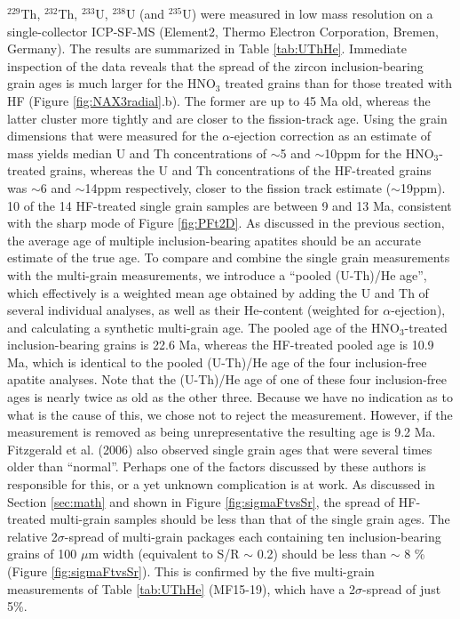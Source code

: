 \documentclass{article}
\begin{document}
$^{229}$Th,  $^{232}$Th,  $^{233}$U,  $^{238}$U (and  $^{235}$U)  were
measured  in  low  mass  resolution on  a  single-collector  ICP-SF-MS
(Element2, Thermo Electron  Corporation, Bremen, Germany). The results
are summarized in Table  \ref{tab:UThHe}.  Immediate inspection of the
data  reveals that the  spread of  the zircon  inclusion-bearing grain
ages  is much larger  for the  HNO$_3$ treated  grains than  for those
treated with HF (Figure \ref{fig:NAX3radial}.b).  The former are up to
45 Ma old,  whereas the latter cluster more tightly  and are closer to
the fission-track age.  Using  the grain dimensions that were measured
for  the $\alpha$-ejection correction  as an  estimate of  mass yields
median  U and  Th concentrations  of $\sim$5  and $\sim$10ppm  for the
HNO$_3$-treated  grains, whereas the  U and  Th concentrations  of the
HF-treated grains was $\sim$6  and $\sim$14ppm respectively, closer to
the  fission track estimate  ($\sim$19ppm).  10  of the  14 HF-treated
single  grain samples are  between 9  and 13  Ma, consistent  with the
sharp mode  of Figure \ref{fig:PFt2D}.   As discussed in  the previous
section, the average age of multiple inclusion-bearing apatites should
be an  accurate estimate of the  true age. To compare  and combine the
single  grain  measurements  with  the  multi-grain  measurements,  we
introduce a ``pooled (U-Th)/He  age'', which effectively is a weighted
mean  age  obtained by  adding  the U  and  Th  of several  individual
analyses,    as    well   as    their    He-content   (weighted    for
$\alpha$-ejection), and calculating  a synthetic multi-grain age.  The
pooled age of the HNO$_3$-treated inclusion-bearing grains is 22.6 Ma,
whereas the  HF-treated pooled age is  10.9 Ma, which  is identical to
the pooled (U-Th)/He age of  the four inclusion-free apatite analyses. 
Note that the  (U-Th)/He age of one of  these four inclusion-free ages
is  nearly twice  as  old as  the  other three.   Because  we have  no
indication as to what is the cause of this, we chose not to reject the
measurement.   However,  if  the   measurement  is  removed  as  being
unrepresentative  the resulting  age is  9.2  Ma.  Fitzgerald  et al.  
(2006) also observed  single grain ages that were  several times older
than  ``normal''.   Perhaps one  of  the  factors  discussed by  these
authors is responsible  for this, or a yet  unknown complication is at
work.   As discussed  in Section  \ref{sec:math} and  shown  in Figure
\ref{fig:sigmaFtvsSr},  the spread  of HF-treated  multi-grain samples
should  be less  than that  of the  single grain  ages.   The relative
2$\sigma$-spread   of  multi-grain   packages   each  containing   ten
inclusion-bearing grains of 100 $\mu$m width (equivalent to S/R $\sim$
0.2) should be  less than $\sim$ 8 \%  (Figure \ref{fig:sigmaFtvsSr}). 
This  is  confirmed by  the  five  multi-grain  measurements of  Table
\ref{tab:UThHe} (MF15-19), which have a 2$\sigma$-spread of just 5\%.
\end{document}
